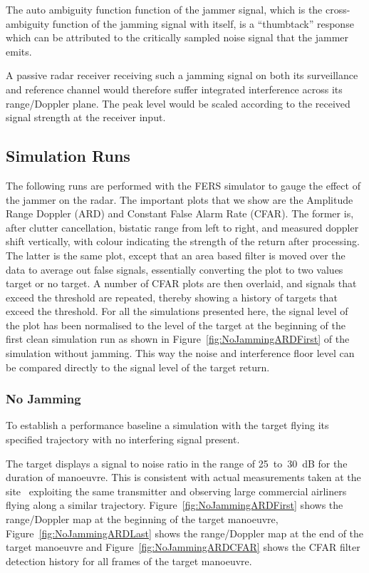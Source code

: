 \documentclass[conference]{IEEEtran}
\begin{document}
The auto ambiguity function function of the jammer signal, which is the cross-ambiguity function of the jamming signal with itself, is a ``thumbtack'' response which can be attributed to the critically sampled noise signal that the jammer emits. 

A passive radar receiver receiving such a jamming signal on both its surveillance and reference channel would therefore suffer integrated interference across its range/Doppler plane. The peak level would be scaled according to the received signal strength at the receiver input.

\subsection{Simulation Runs}\label{sec:ECMSims}


The following runs are performed with the FERS simulator to gauge the effect of the jammer on the radar. The important plots that we show are the Amplitude Range Doppler (ARD) and Constant False Alarm Rate (CFAR). The former is, after clutter cancellation, bistatic range from left to right, and measured doppler shift vertically, with colour indicating the strength of the return after processing. The latter is the same plot, except that an area based filter is moved over the data to average out false signals, essentially converting the plot to two values target or no target. A number of CFAR plots are then overlaid, and signals that exceed the threshold are repeated, thereby showing a history of targets that exceed the threshold. For all the simulations presented here, the signal level of the plot has been normalised to the level of the target at the beginning of the first clean simulation run as shown in Figure~\ref{fig:NoJammingARDFirst} of the simulation without jamming. This way the noise and interference floor level can be compared directly to the signal level of the target return.

\subsubsection{No Jamming}
To establish a performance baseline a simulation with the target flying its specified trajectory with no interfering signal present.

The target displays a signal to noise ratio in the range of 25~to~30~dB for the duration of manoeuvre. This is consistent with actual measurements taken at the site~\cite{inggs2014planning,tong:14} exploiting the same transmitter and observing large commercial airliners flying along a similar trajectory. Figure~\ref{fig:NoJammingARDFirst} shows the range/Doppler map at the beginning of the target manoeuvre, Figure~\ref{fig:NoJammingARDLast} shows the range/Doppler map at the end of the target manoeuvre and Figure~\ref{fig:NoJammingARDCFAR} shows the CFAR filter detection history for all frames of the target manoeuvre.
\end{document}
